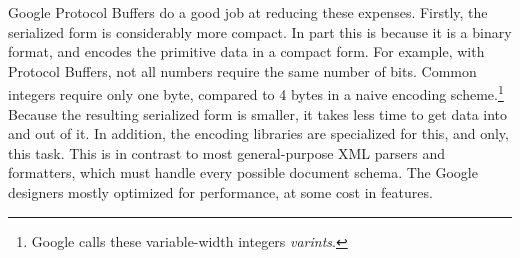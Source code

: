 Google Protocol Buffers do a good job at reducing these expenses. Firstly, the
serialized form is considerably more compact. In part this is because it is a
binary format, and encodes the primitive data in a compact form. For example,
with Protocol Buffers, not all numbers require the same number of bits. Common
integers require only one byte, compared to 4 bytes in a naive encoding
scheme.\footnote{Google calls these variable-width integers \emph{varints}.}
Because the resulting serialized form is smaller, it takes less time to get data
into and out of it. In addition, the encoding libraries are specialized for
this, and only, this task. This is in contrast to most general-purpose XML
parsers and formatters, which must handle every possible document schema. The
Google designers mostly optimized for performance, at some cost in features.


